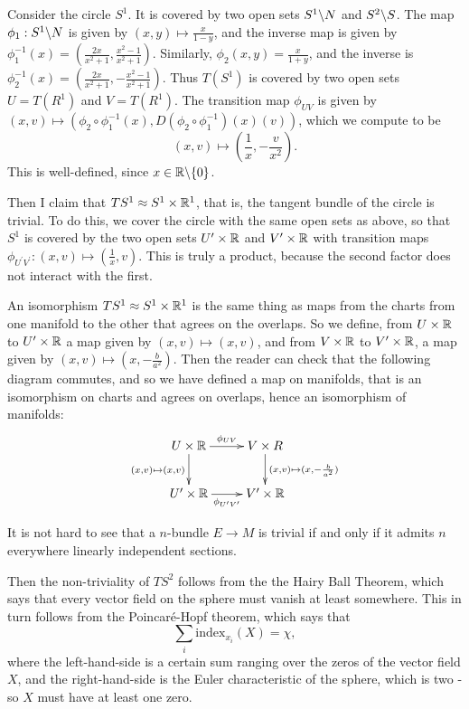 \documentclass[11pt, english]{article}
\begin{document}
\begin{example}
  Consider the circle $S^1$. It is covered by two open sets $S^1 \backslash N$ and $S^2 \backslash S$. The map $\phi_1:S^1 \backslash N$ is given by $(x,y) \mapsto \frac{x}{1-y}$, and the inverse map is given by $\phi_1^{-1}(x)=\left(\frac{2x}{x^2+1}, \frac{x^2-1}{x^2+1} \right)$. Similarly, $\phi_2(x,y) = \frac{x}{1+y}$, and the inverse is $\phi_2^{-1}(x)=\left( \frac{2x}{x^2+1},-\frac{x^2-1}{x^2+1} \right)$. Thus $T(S^1)$ is covered by two open sets $U = T(R^1)$ and $V=T(R^1)$. The transition map $\phi_{UV}$ is given by $(x,v) \mapsto (\phi_2 \circ \phi_1^{-1}(x), D(\phi_2 \circ \phi_1^{-1})(x)(v))$, which we compute to be
\[
(x,v) \mapsto \left (\frac{1}{x}, -\frac{v}{x^2}\right).
\]
This is well-defined, since $x \in \mathbb{R} \backslash \{ 0\}$.

Then I claim that $TS^1 \approx S^1 \times \mathbb{R}^1$, that is, the tangent bundle of the circle is trivial. To do this, we cover the circle with the same open sets as above, so that $S^1$ is covered by the two open sets $U^\prime \times \mathbb{R}$ and $V^\prime \times \mathbb{R}$ with transition maps $\phi_{U^\prime V^\prime}:(x,v) \mapsto (\frac{1}{x}, v)$. This is truly a product, because the second factor does not interact with the first.

An isomorphism $TS^1 \approx S^1 \times \mathbb{R}^1$ is the same thing as maps from the charts from one manifold to the other that agrees on the overlaps. So we define, from $U\times \mathbb{R}$ to $U^\prime \times \mathbb{R}$ a map given by $(x,v) \mapsto (x,v)$, and from $V \times \mathbb{R} $ to $V^\prime \times \mathbb{R}$, a map given by $(x,v) \mapsto \left (x,-\frac{b}{a^2}\right)$. Then the reader can check that the following diagram commutes, and so we have defined a map on manifolds, that is an isomorphism on charts and agrees on overlaps, hence an isomorphism of manifolds:
\[
\xymatrix{
U \times \R \ar@{->}[r]^{\phi_{UV}} \ar@{->}[d]_{(x,v) \mapsto (x,v)} & V \times R \ar@{->}[d]^{(x,v) \mapsto (x,-\frac{b}{a^2})} \\
U^\prime \times \R \ar@{->}[r]_{\phi_{U^\prime V^\prime}} & V^\prime \times \R
}
\]
\end{example}

\begin{example}

It is not hard to see that a $n$-bundle $E \to M$ is trivial if and only if it admits $n$ everywhere linearly independent sections.

Then the non-triviality of $TS^2$ follows from the the Hairy Ball Theorem, which says that every vector field on the sphere must vanish at least somewhere. This in turn follows from the Poincaré-Hopf theorem, which says that
\[
\sum_{i} \mathrm{index}_{x_i}(X) = \chi,
\]
where the left-hand-side is a certain sum ranging over the zeros of the vector field $X$, and the right-hand-side is the Euler characteristic of the sphere, which is two - so $X$ must have at least one zero.
\end{example}
\end{document}
